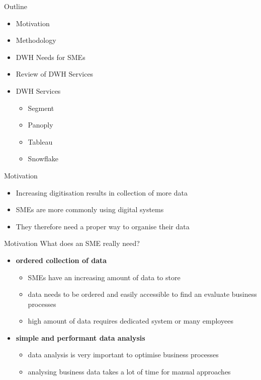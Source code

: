 \documentclass[aspectratio=169]{beamer}
\begin{document}
  \maketitle

   \begin{frame}{Outline}
    \begin{itemize}
      \item Motivation
      \item Methodology
      \item DWH Needs for SMEs
      \item Review of DWH Services
      \item DWH Services
      \begin{itemize}
      		\item Segment
      		\item Panoply
      		\item Tableau
      		\item Snowflake
      \end{itemize}
    \end{itemize}
  \end{frame}

  \begin{frame}{Motivation}
    \begin{itemize}
      \item Increasing digitisation results in collection of more data
      \item SMEs are more commonly using digital systems
      \item They therefore need a proper way to organise their data
    \end{itemize}
  \end{frame}

  \begin{frame}{Motivation}
    What does an SME really need?
    \begin{itemize}
      \item \textbf{ordered collection of data}
      \begin{itemize}
         \item SMEs have an increasing amount of data to store
         \item data needs to be ordered and easily accessible to find an evaluate business processes
         \item high amount of data requires dedicated system or many employees
      \end{itemize}
      \item \textbf{simple and performant data analysis}
		  \begin{itemize}
		    \item data analysis is very important to optimise business processes
		    \item analysing business data takes a lot of time for manual approaches
      \end{itemize}
    \end{itemize}
  \end{frame}
\end{document}
